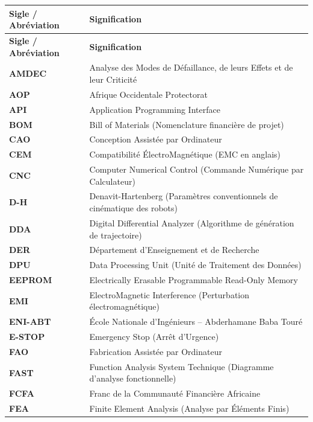 \renewcommand{\arraystretch}{1.25}
\begin{longtable}{|l|p{10.5cm}|}
\hline
\rowcolor{macouleur!20}
\textbf{Sigle / Abréviation} & \textbf{Signification} \\
\hline
\endfirsthead
\hline
\rowcolor{macouleur!20}
\textbf{Sigle / Abréviation} & \textbf{Signification} \\
\hline
\endhead
\hline
\endfoot
\textbf{AMDEC} & Analyse des Modes de Défaillance, de leurs Effets et de leur Criticité \\
\hline
\textbf{AOP} & Afrique Occidentale Protectorat \\
\hline
\textbf{API} & Application Programming Interface \\
\hline
\textbf{BOM} & Bill of Materials (Nomenclature financière de projet) \\
\hline
\textbf{CAO} & Conception Assistée par Ordinateur \\
\hline
\textbf{CEM} & Compatibilité ÉlectroMagnétique (EMC en anglais) \\
\hline
\textbf{CNC} & Computer Numerical Control (Commande Numérique par Calculateur) \\
\hline
\textbf{D-H} & Denavit-Hartenberg (Paramètres conventionnels de cinématique des robots) \\
\hline
\textbf{DDA} & Digital Differential Analyzer (Algorithme de génération de trajectoire) \\
\hline
\textbf{DER} & Département d'Enseignement et de Recherche \\
\hline
\textbf{DPU} & Data Processing Unit (Unité de Traitement des Données) \\
\hline
\textbf{EEPROM} & Electrically Erasable Programmable Read-Only Memory \\
\hline
\textbf{EMI} & ElectroMagnetic Interference (Perturbation électromagnétique) \\
\hline
\textbf{ENI-ABT} & École Nationale d'Ingénieurs – Abderhamane Baba Touré \\
\hline
\textbf{E-STOP} & Emergency Stop (Arrêt d'Urgence) \\
\hline
\textbf{FAO} & Fabrication Assistée par Ordinateur \\
\hline
\textbf{FAST} & Function Analysis System Technique (Diagramme d'analyse fonctionnelle) \\
\hline
\textbf{FCFA} & Franc de la Communauté Financière Africaine \\
\hline
\textbf{FEA} & Finite Element Analysis (Analyse par Éléments Finis) \\

\end{longtable}
